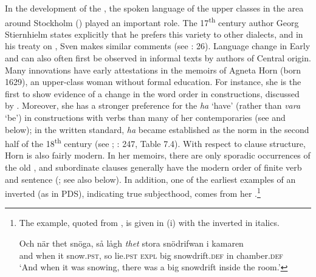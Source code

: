 \documentclass[output=paper]{langscibook}
\begin{document}
In the development of the , the spoken language of the upper classes in the area around Stockholm () played an important role. The 17\textsuperscript{th} century author Georg Stiernhielm states explicitly that he prefers this variety to other dialects, and in his treaty on , Sven \citet{Hof1753} makes similar comments (see \citealt{Widmark2000}: 26). Language change in Early and  can also often first be observed in informal texts by authors of Central  origin. Many innovations have early attestations in the memoirs of Agneta Horn (born 1629), an upper-class woman without formal education. For instance, she is the first to show evidence of a change in the word order in  constructions, discussed by . Moreover, she has a stronger preference for the  \textit{ha} ‘have’ (rather than \textit{vara} ‘be’) in  constructions with  verbs than many of her contemporaries (see \citealt{Larsson2009} and below); in the written standard, \textit{ha} became established as the norm in the second half of the 18\textsuperscript{th} century (see \citealt{Johannisson1945}; \citealt{Larsson2009}: 247, Table 7.4). With respect to clause structure, Horn is also fairly modern. In her memoirs, there are only sporadic occurrences of the old  \citep{Petzell2011}, and subordinate clauses generally have the modern order of finite verb and sentence  (\citealt{Falk1993}; see also  below). In addition, one of the earliest examples of an inverted  (as in PDS), indicating true subjecthood, comes from her \citep[268]{Falk1993}.\footnote{The example, quoted from \citet[268]{Falk1993}, is given in (i) with the inverted  in italics.

\ea\gll Och  när    thet  snöga,    så  lågh \textit{thet} stora  snödrifwan    i    kamaren\\
        and  when  it      snow.\textsc{pst},  so  lie.\textsc{pst}  \textsc{expl}  big    snowdrift.\textsc{def} in  chamber.\textsc{def}\\
   \glt ‘And when it was snowing, there was a big snowdrift inside the room.’
   \z}
\end{document}

